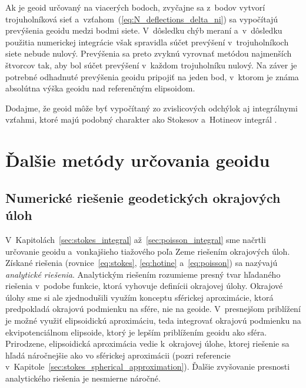 \documentclass[a4paper, 12pt]{book}
\begin{document}
Ak je geoid určovaný na viacerých bodoch, zvyčajne sa z~bodov vytvorí 
trojuholníková sieť a~vzťahom~(\ref{eq:N_deflections_delta_ni}) sa vypočítajú 
prevýšenia geoidu medzi bodmi siete.  V~dôsledku chýb meraní a~v~dôsledku 
použitia numerickej integrácie však spravidla súčet prevýšení v~trojuholníkoch 
siete nebude nulový.  Prevýšenia sa preto zvyknú vyrovnať metódou najmenších 
štvorcov tak, aby bol súčet prevýšení v~každom trojuholníku nulový.  Na záver 
je potrebné odhadnuté prevýšenia geoidu pripojiť na jeden bod, v~ktorom je 
známa absolútna výška geoidu nad referenčným elipsoidom.

Dodajme, že geoid môže byť vypočítaný zo zvislicových odchýlok aj integrálnymi 
vzťahmi, ktoré majú podobný charakter ako Stokesov a~Hotineov integrál 
\parencite[pozri napríklad][]{Sjoberg2017}.


\section{Ďalšie metódy určovania geoidu}
\label{sec:other_geoid_determination_methods}

\subsection{Numerické riešenie geodetických okrajových úloh}

V~Kapitolách~\ref{sec:stokes_integral} až~\ref{sec:poisson_integral} sme 
načrtli určovanie geoidu a~vonkajšieho tiažového poľa Zeme riešením okrajových 
úloh.  Získané riešenia (rovnice~\ref{eq:stokes}, \ref{eq:hotine} 
a~\ref{eq:poisson}) sa nazývajú \emph{analytické riešenia}.  Analytickým 
riešením rozumieme presný tvar hľadaného riešenia v~podobe funkcie, ktorá 
vyhovuje definícii okrajovej úlohy.  Okrajové úlohy sme si ale zjednodušili 
využím konceptu sférickej aproximácie, ktorá predpokladá okrajovú podmienku na 
sfére, nie na geoide.  V~presnejšom priblížení je možné využiť elipsoidickú 
aproximáciu, teda integrovať okrajovú podmienku na ekvipotenciálnom elipsoide, 
ktorý je lepším priblížením geoidu ako sféra.  Prirodzene, elipsoidická 
aproximácia vedie k~okrajovej úlohe, ktorej riešenie sa hľadá náročnejšie ako 
vo sférickej aproximácii (pozri referencie 
v~Kapitole~\ref{sec:stokes_spherical_approximation}).  Ďalšie zvyšovanie 
presnosti analytického riešenia je nesmierne náročné.
\end{document}
